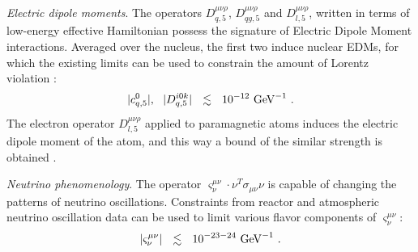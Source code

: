 \documentclass[12pt,preprintnumbers,nofootinbib]{revtex4}
\newcommand{\GeV}{{\rm GeV}}
\begin{document}
	

	{\it Electric dipole moments}. 
	The operators $ D_{q,5}^{\mu\nu\rho} $, $ D_{qg,5}^{\mu\nu\rho} $ and
	$ D_{l,5}^{\mu\nu\rho} $, written in terms of low-energy effective Hamiltonian
	possess the signature of Electric Dipole Moment interactions.
	Averaged over the nucleus, the first two induce nuclear EDMs, for which the 
	existing limits can be used to constrain the amount of Lorentz violation
\cite{Bolokhov:2006yx}:
\[
	|c_{q,5}^0|,~~ | D_{q,5}^{i0k} | ~~\lesssim~~ 10^{-12}~\GeV^{-1}~.
\]
	The electron operator $ D_{l,5}^{\mu\nu\rho} $ applied to paramagnetic atoms induces
	the electric dipole moment of the atom, and this way a bound of the similar strength
	is obtained
\cite{Bolokhov:2006yx}.

	{\it Neutrino phenomenology}.
	The operator $ \varsigma^{\mu\nu}_\nu \cdot \nu^T \sigma_{\mu\nu} \nu $ is capable
	of changing the patterns of neutrino oscillations.
	Constraints from reactor and atmospheric neutrino oscillation data can be used 
\cite{Choubey:2003ke}
	to limit various flavor components of $ \varsigma_\nu^{\mu\nu} $:
\[
	| \varsigma_\nu^{\mu\nu} | ~~\lesssim~~ 10^{-23-24}~\GeV^{-1}~.
\]
	
\end{document}
